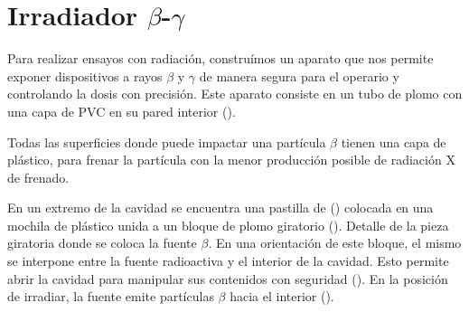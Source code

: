 \section{Irradiador $\beta$-$\gamma$}
\label{sec:irradiador}
Para realizar ensayos con radiación,
construímos un aparato que nos permite exponer dispositivos a rayos $\beta$ y
$\gamma$ de manera segura para el operario y controlando la dosis con precisión.
Este aparato consiste en un tubo de plomo con una capa de PVC en su pared
interior ().

Todas las superficies donde puede impactar una partícula $\beta$ tienen una
capa de plástico,
para frenar la partícula con la menor producción posible de
radiación X de frenado.

En un extremo de la cavidad se encuentra una pastilla de \Strontium 
()
colocada en una mochila de plástico unida a un bloque de plomo giratorio
().
{Detalle de la pieza giratoria donde se coloca la fuente $\beta$.}
En una orientación de este bloque,
el mismo se interpone entre la fuente radioactiva y el interior de la cavidad.
Esto permite abrir la cavidad para manipular sus contenidos con seguridad
().
En la posición de irradiar, la fuente emite partículas $\beta$ hacia el interior
().

